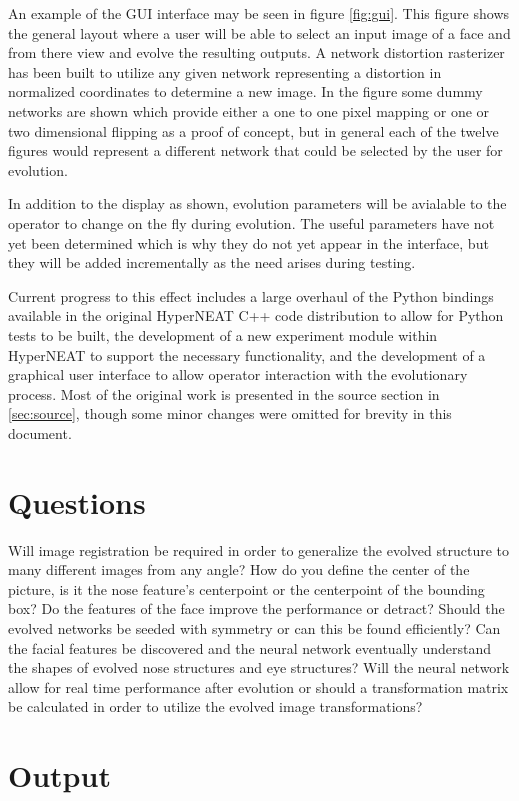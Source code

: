 \documentclass[a4paper,10pt]{article}
\begin{document}
An example of the GUI interface may be seen in figure \ref{fig:gui}. This figure shows the general layout where a user will be able to select an input image of a face and from there view and evolve the resulting outputs. A network distortion rasterizer has been built to utilize any given network representing a distortion in normalized coordinates to determine a new image. In the figure some dummy networks are shown which provide either a one to one pixel mapping or one or two dimensional flipping as a proof of concept, but in general each of the twelve figures would represent a different network that could be selected by the user for evolution.

In addition to the display as shown, evolution parameters will be avialable to the operator to change on the fly during evolution. The useful parameters have not yet been determined which is why they do not yet appear in the interface, but they will be added incrementally as the need arises during testing.

Current progress to this effect includes a large overhaul of the Python bindings available in the original HyperNEAT C++ code distribution to allow for Python tests to be built, the development of a new experiment module within HyperNEAT to support the necessary functionality, and the development of a graphical user interface to allow operator interaction with the evolutionary process. Most of the original work is presented in the source section in \ref{sec:source}, though some minor changes were omitted for brevity in this document.

\section{Questions}

Will image registration be required in order to generalize the evolved structure to many different images from any angle? How do you define the center of the picture, is it the nose feature’s centerpoint or the centerpoint of the bounding box? Do the features of the face improve the performance or detract? Should the evolved networks be seeded with symmetry or can this be found efficiently? Can the facial features be discovered and the neural network eventually understand the shapes of evolved nose structures and eye structures? Will the neural network allow for real time performance after evolution or should a transformation matrix be calculated in order to utilize the evolved image transformations?

\section{Output}
\end{document}

